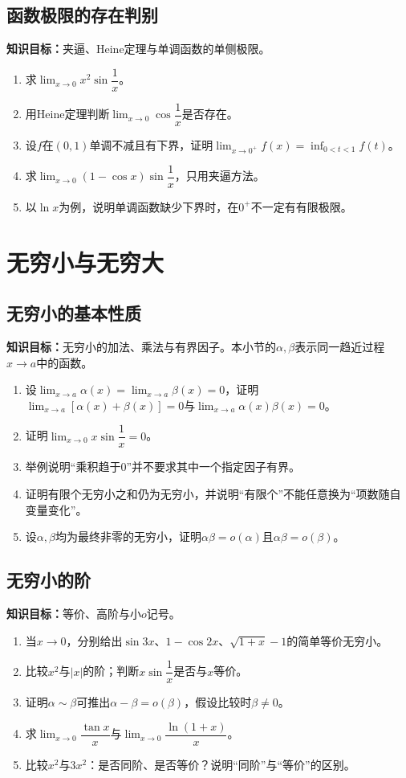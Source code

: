 \documentclass[11pt,a4paper,fontset=fandol]{ctexrep}
\newcommand{\goal}[1]{\textbf{知识目标：}#1\par}
\begin{document}
\subsection{函数极限的存在判别}
\goal{夹逼、Heine定理与单调函数的单侧极限。}
\begin{enumerate}
\item 求$\lim_{x\to0}x^2\sin\dfrac{1}{x}$。
\item 用Heine定理判断$\lim_{x\to0}\cos\dfrac{1}{x}$是否存在。
\item 设$f$在$(0,1)$单调不减且有下界，证明$\lim_{x\to0^+}f(x)=\inf_{0<t<1}f(t)$。
\item 求$\lim_{x\to0}(1-\cos x)\sin\dfrac{1}{x}$，只用夹逼方法。
\item 以$\ln x$为例，说明单调函数缺少下界时，在$0^+$不一定有有限极限。
\end{enumerate}
\section{无穷小与无穷大}
\subsection{无穷小的基本性质}
\goal{无穷小的加法、乘法与有界因子。本小节的$\alpha,\beta$表示同一趋近过程$x\to a$中的函数。}
\begin{enumerate}
\item 设$\lim_{x\to a}\alpha(x)=\lim_{x\to a}\beta(x)=0$，证明$\lim_{x\to a}[\alpha(x)+\beta(x)]=0$与$\lim_{x\to a}\alpha(x)\beta(x)=0$。
\item 证明$\lim_{x\to0}x\sin\dfrac{1}{x}=0$。
\item 举例说明“乘积趋于0”并不要求其中一个指定因子有界。
\item 证明有限个无穷小之和仍为无穷小，并说明“有限个”不能任意换为“项数随自变量变化”。
\item 设$\alpha,\beta$均为最终非零的无穷小，证明$\alpha\beta=o(\alpha)$且$\alpha\beta=o(\beta)$。
\end{enumerate}
\subsection{无穷小的阶}
\goal{等价、高阶与小$o$记号。}
\begin{enumerate}
\item 当$x\to0$，分别给出$\sin3x$、$1-\cos2x$、$\sqrt{1+x}-1$的简单等价无穷小。
\item 比较$x^2$与$|x|$的阶；判断$x\sin\dfrac{1}{x}$是否与$x$等价。
\item 证明$\alpha\sim\beta$可推出$\alpha-\beta=o(\beta)$，假设比较时$\beta\ne0$。
\item 求$\lim_{x\to0}\dfrac{\tan x}{x}$与$\lim_{x\to0}\dfrac{\ln(1+x)}{x}$。
\item 比较$x^2$与$3x^2$：是否同阶、是否等价？说明“同阶”与“等价”的区别。
\end{enumerate}
\end{document}
